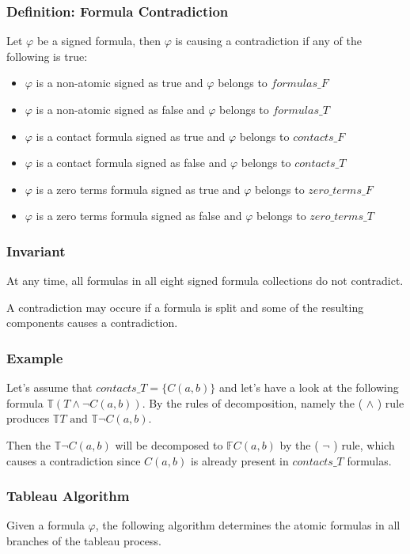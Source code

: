 \documentclass{article}
\begin{document}
	\subsubsection*{Definition: Formula Contradiction}
	Let $\varphi$ be a signed formula, then $\varphi$ is causing a contradiction if any of the following is true:
	\begin{itemize}
		\item $\varphi$ is a non-atomic signed as true and $\varphi$ belongs to $formulas\_F$
		\item $\varphi$ is a non-atomic signed as false and $\varphi$ belongs to $formulas\_T$
		\item $\varphi$ is a contact formula signed as true and $\varphi$ belongs to $contacts\_F$
		\item $\varphi$ is a contact formula signed as false and $\varphi$ belongs to $contacts\_T$
		\item $\varphi$ is a zero terms formula signed as true and $\varphi$ belongs to $zero\_terms\_F$
		\item $\varphi$ is a zero terms formula signed as false and $\varphi$ belongs to $zero\_terms\_T$
	\end{itemize}

	\subsubsection*{Invariant}
	At any time, all formulas in all eight signed formula collections do not contradict.

	A contradiction may occure if a formula is split and some of the resulting components causes a contradiction.

	\subsubsection*{Example}
	Let's assume that $contacts\_T = \{ C(a, b)\}$ and let's have a look at the following formula $\mathbb{T}(T \wedge \neg C(a,b))$.
	\newline
	By the rules of decomposition, namely the ( $\wedge$ ) rule produces $\mathbb{T}T \text{ and } \mathbb{T}\neg C(a,b)$.

	Then the $\mathbb{T}\neg C(a,b)$ will be decomposed to $\mathbb{F} C(a,b)$ by the ( $\neg$ ) rule, which causes a contradiction since $C(a,b)$ is already present in $contacts\_T$ formulas.

	\subsubsection*{Tableau Algorithm}
	Given a formula $\varphi$, the following algorithm determines the atomic formulas in all branches of the tableau process.
\end{document}
